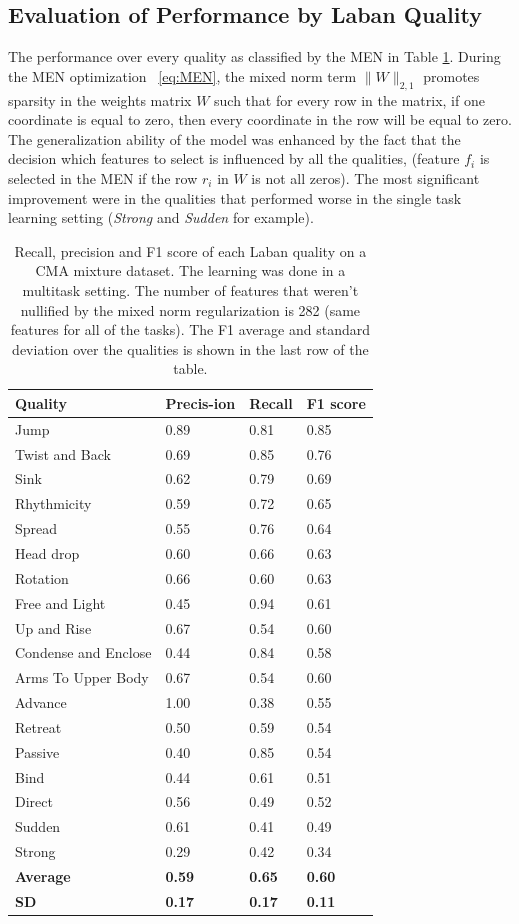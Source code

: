 \documentclass[11pt,twocolumn,varwidth=true,a4paper,fleqn]{sigchi}
\begin{document}
\subsection{Evaluation of Performance by Laban Quality}
The performance over every quality as classified by the MEN in Table
\ref{mixedSummary}. During the MEN optimization ~\eqref{eq:MEN}, the mixed norm
term $\|W\|_{2,1}$  promotes sparsity in the weights matrix $W$ such that for
every row in the matrix, if one coordinate is equal to zero, then every coordinate
in the row will be equal to zero.
\\The generalization ability of the model was enhanced by the fact that the
decision which features to select is influenced by all the qualities, (feature $f_i$ is
selected in the MEN if the row $r_i$ in $W$ is not all zeros). The most
significant improvement were in the qualities that performed worse in the
single task learning setting (\textit{Strong} and \textit{Sudden} for example).
\begin{table}[!h]
\centering
\begin{tabular}{|p{3cm}|p{0.9cm}|p{0.9cm}|p{0.9cm}|}
\hline
Quality&Precis-ion&Recall&F1 score\\\hline
Jump&0.89&0.81&0.85\\\hline
Twist and Back&0.69&0.85&0.76\\\hline
Sink&0.62&0.79&0.69\\\hline
Rhythmicity&0.59&0.72&0.65\\\hline
Spread&0.55&0.76&0.64\\\hline
Head drop&0.60&0.66&0.63\\\hline
Rotation&0.66&0.60&0.63\\\hline
Free and Light&0.45&0.94&0.61\\\hline
Up and Rise&0.67&0.54&0.60\\\hline
Condense and Enclose&0.44&0.84&0.58\\\hline
Arms To Upper Body&0.67&0.54&0.60\\\hline
Advance&1.00&0.38&0.55\\\hline
Retreat&0.50&0.59&0.54\\\hline
Passive&0.40&0.85&0.54\\\hline
Bind&0.44&0.61&0.51\\\hline
Direct&0.56&0.49&0.52\\\hline
Sudden&0.61&0.41&0.49\\\hline
Strong&0.29&0.42&0.34\\\hline
\textbf{Average}&\textbf{0.59}&\textbf{0.65}&\textbf{0.60}\\\hline
\textbf{SD}&\textbf{0.17}&\textbf{0.17}&\textbf{0.11}\\\hline
\end{tabular}
\caption{Recall, precision and F1 score of each Laban quality on a CMA
mixture dataset. The learning was done in a multitask setting. The number of
features that weren't nullified by the mixed norm regularization is
282 (same features for all of the tasks). The F1 average and standard
deviation over the qualities is shown in the last row of the table.}
\label{mixedSummary}
\end{table}
\end{document}
